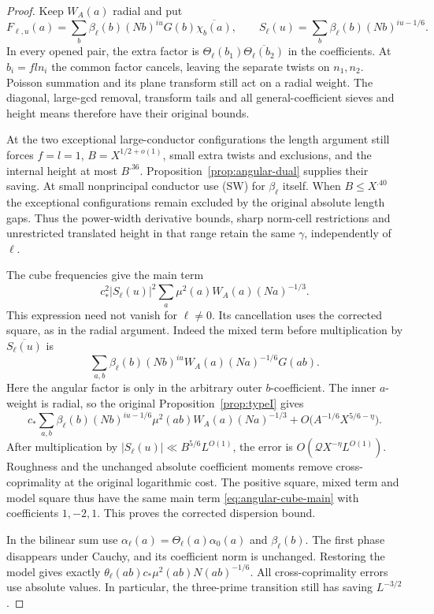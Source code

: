 \begin{proof}
Keep $W_A(a)$ radial and put
\[
 F_{\ell,u}(a)=\sum_b\beta_\ell(b)(Nb)^{iu}G(b)
                       \overline{\chi_b(a)},\qquad
 S_\ell(u)=\sum_b\beta_\ell(b)(Nb)^{iu-1/6}.
\]
In every opened pair, the extra factor is
$\Theta_\ell(b_1)\overline{\Theta_\ell(b_2)}$ in the
coefficients. At $b_i=fln_i$ the common factor cancels, leaving
the separate twists on $n_1,n_2$. Poisson summation and its
plane transform still act on a radial weight. The diagonal,
large-gcd removal, transform tails and all general-coefficient
sieves and height means therefore have their original bounds.

At the two exceptional large-conductor configurations the length
argument still forces $f=l=1$, $B=X^{1/2+o(1)}$, small extra
twists and exclusions, and the internal height at most $B^{.36}$.
Proposition~\ref{prop:angular-dual} supplies their saving.
At small nonprincipal conductor use \textup{(SW)} for
$\beta_\ell$ itself. When $B\le X^{.40}$ the exceptional
configurations remain excluded by the original absolute length
gaps. Thus the power-width derivative bounds, sharp norm-cell
restrictions and unrestricted translated height in that range
retain the same $\gamma$, independently of $\ell$.

The cube frequencies give the main term
\begin{equation}\label{eq:angular-cube-main}
 c_*^2|S_\ell(u)|^2
       \sum_a\mu^2(a)W_A(a)(Na)^{-1/3}.
\end{equation}
This expression need not vanish for $\ell\ne0$. Its cancellation
uses the corrected square, as in the radial argument. Indeed the
mixed term before multiplication by $\overline{S_\ell(u)}$ is
\[
 \sum_{a,b}\beta_\ell(b)(Nb)^{iu}
                  W_A(a)(Na)^{-1/6}G(ab).
\]
Here the angular factor is only in the arbitrary outer
$b$-coefficient. The inner $a$-weight is radial, so the original
Proposition~\ref{prop:typeI} gives
\[
 c_*\sum_{a,b}\beta_\ell(b)(Nb)^{iu-1/6}
          \mu^2(ab)W_A(a)(Na)^{-1/3}
   +O\bigl(A^{-1/6}X^{5/6-\eta}\bigr).
\]
After multiplication by
$|S_\ell(u)|\ll B^{5/6}L^{O(1)}$, the error is
$O(\mathcal QX^{-\eta}L^{O(1)})$.
Roughness and the unchanged absolute coefficient moments remove
cross-coprimality at the original logarithmic cost. The positive
square, mixed term and model square thus have the same main
term \eqref{eq:angular-cube-main} with coefficients $1,-2,1$.
This proves the corrected dispersion bound.

In the bilinear sum use
$\alpha_\ell(a)=\Theta_\ell(a)\alpha_0(a)$ and
$\beta_\ell(b)$. The first phase disappears under Cauchy,
and its coefficient norm is unchanged. Restoring the model
gives exactly $\theta_\ell(ab)c_*\mu^2(ab)N(ab)^{-1/6}$.
All cross-coprimality errors use absolute values. In particular,
the three-prime transition still has saving $L^{-3/2}$.


\end{proof}
